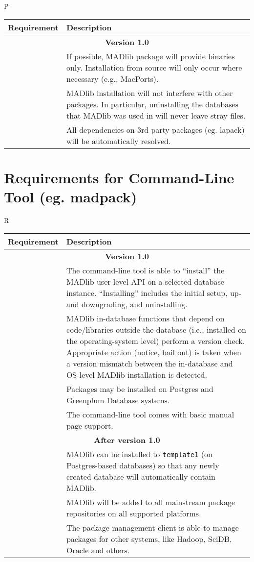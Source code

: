 \documentclass[11pt]{article}
\begin{document}
{\begin{mlreq}{P}
\begin{tabular}{|l|p{133mm}|}
\hline
	\textbf{Requirement} & \textbf{Description} \\
\hline
	\multicolumn{2}{|c|}{\bf Version 1.0} \\
\hline
	\mlr & If possible, MADlib package will provide binaries only. Installation from source will only occur where necessary (e.g., MacPorts). \\
\hline
	\mlr & MADlib installation will not interfere with other packages. In particular, uninstalling the databases that MADlib was used in will never leave stray files. \\
\hline
	\mlr & All dependencies  on 3rd party packages (eg. lapack) will be automatically resolved. \\
\hline

\end{tabular}
\end{mlreq}

\section{Requirements for Command-Line Tool (eg. madpack)}
	
\begin{mlreq}{R}
\begin{tabular}{|l|p{133mm}|}
\hline
	\textbf{Requirement} & \textbf{Description} \\
\hline
	\multicolumn{2}{|c|}{\bf Version 1.0} \\
\hline
	\mlr & The command-line tool is able to ``install'' the MADlib user-level API on a selected database instance. ``Installing'' includes the initial setup, up\nobreakdash- and downgrading, and uninstalling. \\
\hline
	\mlr & MADlib in-database functions that depend on code/libraries outside the database (i.e., installed on the operating-system level) perform a version check. Appropriate action (notice, bail out) is taken when a version mismatch between the in-database and OS-level MADlib installation is detected. \\
\hline
	\mlr & Packages may be installed on Postgres and Greenplum Database systems. \\
\hline
	\mlr & The command-line tool comes with basic manual page support.\\
\hline
	\multicolumn{2}{|c|}{\bf After version 1.0} \\
\hline
	\mlr & MADlib can be installed to \texttt{template1} (on Postgres-based databases) so that any
newly created database will automatically contain MADlib. \\
\hline
	\mlr & MADlib will be added to all mainstream package repositories on all supported platforms. \\
\hline
	\mlr & The package management client is able to manage packages for other
		   systems, like Hadoop, SciDB, Oracle and others. \\
\hline


\end{tabular}
\end{mlreq}}
\end{document}
